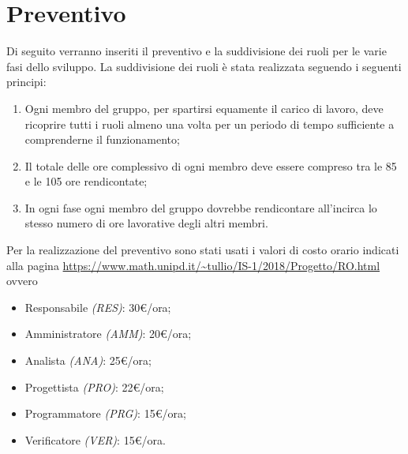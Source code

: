 	\section{Preventivo}
	Di seguito verranno inseriti il preventivo e la suddivisione dei ruoli per le varie fasi dello sviluppo. La suddivisione dei ruoli è stata realizzata seguendo i seguenti principi:
	\begin{enumerate}
		\item Ogni membro del gruppo, per spartirsi equamente il carico di lavoro, deve ricoprire tutti i ruoli almeno una volta per un periodo di tempo sufficiente a comprenderne il funzionamento;
		\item Il totale delle ore complessivo di ogni membro deve essere compreso tra le 85 e le 105 ore rendicontate;
		\item In ogni fase ogni membro del gruppo dovrebbe rendicontare all'incirca lo stesso numero di ore lavorative degli altri membri.
	\end{enumerate} 
	Per la realizzazione del preventivo sono stati usati i valori di costo orario indicati alla pagina \url{https://www.math.unipd.it/~tullio/IS-1/2018/Progetto/RO.html} ovvero
	\begin{itemize}
		\item Responsabile \textit{(RES)}: 30\euro/ora;
		\item Amministratore \textit{(AMM)}: 20\euro/ora;
		\item Analista \textit{(ANA)}: 25\euro/ora;
		\item Progettista \textit{(PRO)}: 22\euro/ora;
		\item Programmatore \textit{(PRG)}: 15\euro/ora;
		\item Verificatore \textit{(VER)}: 15\euro/ora.
	\end{itemize}	
	
	
	\newpage
	
	\newpage
	
	\newpage
	
	\newpage
	
